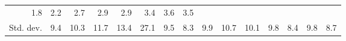 \begin{tabular}{lllllllllllllll}
  \multicolumn{1}{r}{1.8} &
  \multicolumn{1}{r}{2.2} &
  \multicolumn{1}{r}{2.7} &
  \multicolumn{1}{r}{2.9} &
  \multicolumn{1}{r}{2.9} &
  \multicolumn{1}{r}{3.4} &
  \multicolumn{1}{r}{3.6} &
  \multicolumn{1}{r}{3.5} \\
\multicolumn{1}{l}{\hspace{2em}Std. dev.} &
  \multicolumn{1}{|r}{9.4} &
  \multicolumn{1}{r}{10.3} &
  \multicolumn{1}{r}{11.7} &
  \multicolumn{1}{r}{13.4} &
  \multicolumn{1}{r}{27.1} &
  \multicolumn{1}{r}{9.5} &
  \multicolumn{1}{r}{8.3} &
  \multicolumn{1}{r}{9.9} &
  \multicolumn{1}{r}{10.7} &
  \multicolumn{1}{r}{10.1} &
  \multicolumn{1}{r}{9.8} &
  \multicolumn{1}{r}{8.4} &
  \multicolumn{1}{r}{9.8} &
  \multicolumn{1}{r}{8.7} \\
\cline{1-15}
\end{tabular}
